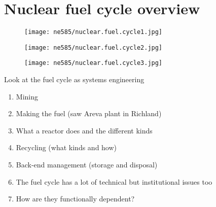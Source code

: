 \documentclass[aspectratio=1610,pdftex,dvipsnames,compress,xcolor={dvipsnames}]{beamer}
\begin{document}
\section{Nuclear fuel cycle overview}


\addtocounter{framenumber}{-1} 
\begin{frame}{}
    \begin{figure}
        \centering
        \texttt{[image: ne585/nuclear.fuel.cycle1.jpg]}
    \end{figure}
\end{frame}


\begin{frame}{}
    \begin{figure}
        \centering
        \texttt{[image: ne585/nuclear.fuel.cycle2.jpg]}
    \end{figure}
\end{frame}

\begin{frame}{}
    \begin{figure}
        \centering
        \texttt{[image: ne585/nuclear.fuel.cycle3.jpg]}
    \end{figure}
\end{frame}


\begin{frame}{Look at the fuel cycle as systems engineering}
    \begin{enumerate}[series=outerlist,topsep=0pt,itemsep=21pt,leftmargin=*,label=(\arabic*)]
        \item[]Mining
        \item[]Making the fuel (saw Areva plant in Richland)
        \item[]What a reactor does and the different kinds
        \item[]Recycling (what kinds and how)
        \item[]Back-end management (storage and disposal)
        \item[]The fuel cycle has a lot of technical but institutional issues too
        \item[]How are they functionally dependent? 
    \end{enumerate}
\end{frame}
\end{document}
